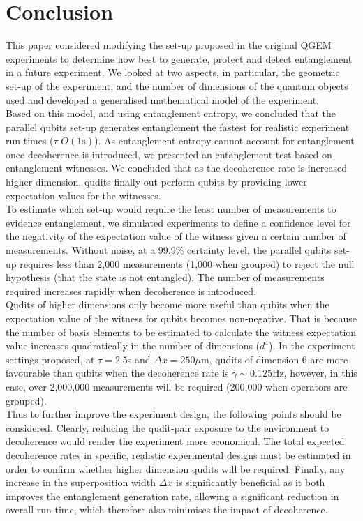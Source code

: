 \documentclass[%
 reprint,
 superscriptaddress,
 amsmath,
 amssymb,
 aps,
 longbibliography
]{revtex4-2}
\begin{document}
\section{Conclusion\label{sec:conclusion}}

\indent This paper considered modifying the set-up proposed in the original QGEM experiments to determine how best to generate, protect and detect entanglement in a future experiment. We looked at two aspects, in particular, the geometric set-up of the experiment, and the number of dimensions of the quantum objects used and developed a generalised mathematical model of the experiment. \\
\indent Based on this model, and using entanglement entropy, we concluded that the parallel qubits set-up generates entanglement the fastest for realistic experiment run-times ($\tau$ $O\left(1\mathrm{s}\right)$). As entanglement entropy cannot account for entanglement once decoherence is introduced, we presented an entanglement test based on entanglement witnesses. We concluded that as the decoherence rate is increased higher dimension, qudits finally out-perform qubits by providing lower expectation values for the witnesses. \\
\indent To estimate which set-up would require the least number of measurements to evidence entanglement, we simulated experiments to define a confidence level for the negativity of the expectation value of the witness given a certain number of measurements. Without noise, at a 99.9$\%$ certainty level, the parallel qubits set-up requires less than 2,000 measurements (1,000 when grouped) to reject the null hypothesis (that the state is not entangled). The number of measurements required increases rapidly when decoherence is introduced. \\
\indent Qudits of higher dimensions only become more useful than qubits when the expectation value of the witness for qubits becomes non-negative. That is because the number of basis elements to be estimated to calculate the witness expectation value increases quadratically in the number of dimensions ($d^4$). In the experiment settings proposed, at $\tau=2.5$s and $\Delta x = 250 \mu$m, qudits of dimension 6 are more favourable than qubits when the decoherence rate is $\gamma\sim0.125$Hz, however, in this case, over 2,000,000 measurements will be required (200,000 when operators are grouped). \\
\indent Thus to further improve the experiment design, the following points should be considered. Clearly, reducing the qudit-pair exposure to the environment to decoherence would render the experiment more economical. The total expected decoherence rates in specific, realistic experimental designs must be estimated in order to confirm whether higher dimension qudits will be required. Finally, any increase in the superposition width $\Delta x$ is significantly beneficial as it both improves the entanglement generation rate, allowing a significant reduction in overall run-time, which therefore also minimises the impact of decoherence. 
\end{document}
